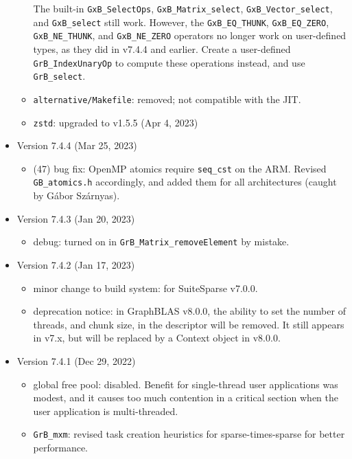 \documentclass[12pt]{article}
\begin{document}
\begin{itemize}
\begin{itemize}
        The built-in \verb'GxB_SelectOps', \verb'GxB_Matrix_select',
        \verb'GxB_Vector_select', and \verb'GxB_select' still work.  However,
        the \verb'GxB_EQ_THUNK', \verb'GxB_EQ_ZERO', \verb'GxB_NE_THUNK', and
        \verb'GxB_NE_ZERO' operators no longer work on user-defined types,
        as they did in v7.4.4 and earlier.
        Create a user-defined \verb'GrB_IndexUnaryOp' to compute these
        operations instead, and use \verb'GrB_select'.
    \item \verb'alternative/Makefile': removed; not compatible with the JIT.
    \item \verb'zstd': upgraded to v1.5.5 (Apr 4, 2023)
    \end{itemize}

\item Version 7.4.4 (Mar 25, 2023)

    \begin{itemize}
    \item (47) bug fix: OpenMP atomics require \verb'seq_cst' on the ARM.
        Revised \verb'GB_atomics.h' accordingly, and added them for all
        architectures (caught by G{\'{a}}bor Sz{\'{a}}rnyas).
    \end{itemize}

\item Version 7.4.3 (Jan 20, 2023)

    \begin{itemize}
    \item debug: turned on in \verb'GrB_Matrix_removeElement' by mistake.
    \end{itemize}

\item Version 7.4.2 (Jan 17, 2023)

    \begin{itemize}
    \item minor change to build system: for SuiteSparse v7.0.0.
    \item deprecation notice:  in GraphBLAS v8.0.0, the ability to set the
        number of threads, and chunk size, in the descriptor will be removed.
        It still appears in v7.x, but will be replaced by a Context object
        in v8.0.0.
    \end{itemize}

\item Version 7.4.1 (Dec 29, 2022)

    \begin{itemize}
    \item global free pool: disabled.  Benefit for single-thread user
        applications was modest, and it causes too much contention in a
        critical section when the user application is multi-threaded.
    \item \verb'GrB_mxm': revised task creation heuristics for
        sparse-times-sparse for better performance.
    \end{itemize}


\end{itemize}
\end{document}

